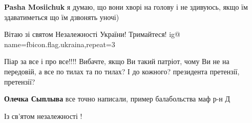 \begin{itemize}
\begin{itemize}
 
\textbf{Pasha Mosiichuk} я думаю, що вони хворі на голову і не здивуюсь, якщо їм здаватиметься що їм дзвонять уночі)
\end{itemize}

 
Вітаю зі святом Незалежності України! Тримайтеся! 
\ifcmt
  ig@ name=fbicon.flag.ukraina,repeat=3
\fi


 

Піар за все і про все!!!! Вибачте, якщо Ви такий патріот, чому Ви не на
передовій, а все по тилах та по тилах? І до кожного? президента
претензії, претензії?

\begin{itemize}
 
\textbf{Олечка Сыплыва} все точно написали, пример балабольства маф р-н Д
\end{itemize}

 
Із св'ятом незалежності !

 

\end{itemize}
